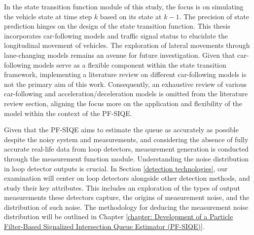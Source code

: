 In the state transition function module of this study, the focus is on simulating the vehicle state at time step $k$ based on its state at $k-1$. The precision of state prediction hinges on the design of the state transition function. This thesis incorporates car-following models and traffic signal status to elucidate the longitudinal movement of vehicles. The exploration of lateral movements through lane-changing models remains an avenue for future investigation. Given that car-following models serve as a flexible component within the state transition framework, implementing a literature review on different car-following models is not the primary aim of this work. Consequently, an exhaustive review of various car-following and acceleration/deceleration models is omitted from the literature review section, aligning the focus more on the application and flexibility of the model within the context of the PF-SIQE.

Given that the PF-SIQE aims to estimate the queue as accurately as possible despite the noisy system and measurements, and considering the absence of fully accurate real-life data from loop detectors, measurement generation is conducted through the measurement function module. Understanding the noise distribution in loop detector outputs is crucial. In Section \ref{detection technologies}, our examination will center on loop detectors alongside other detection methods, and study their key attributes. This includes an exploration of the types of output measurements these detectors capture, the origins of measurement noise, and the distribution of such noise. The methodology for deducing the measurement noise distribution will be outlined in Chapter \ref{chapter: Development of a Particle Filter-Based Signalized Intersection Queue Estimator (PF-SIQE)}.

